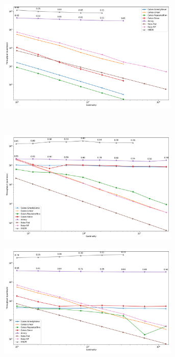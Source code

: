 \begin{figure}
\begin{subfigure}[b]{0.47\textwidth}
\label{fig:results:sift-scaling}
\end{subfigure}%
\begin{subfigure}[b]{0.47\textwidth}
\includegraphics[width=0.95\textwidth]{plots/random-1000000-128-knn-10.png}
\label{fig:results:random-scaling}
\end{subfigure}%
\vspace{1em}
\\
\begin{subfigure}[b]{0.47\textwidth}
\includegraphics[width=0.95\textwidth]{plots/silva-knn-10.png}
\label{fig:results:silva-scaling}
\end{subfigure}%
\begin{subfigure}[b]{0.47\textwidth}
\includegraphics[width=0.95\textwidth]{plots/radioml-knn-10.png}

\end{subfigure}
\end{figure}
